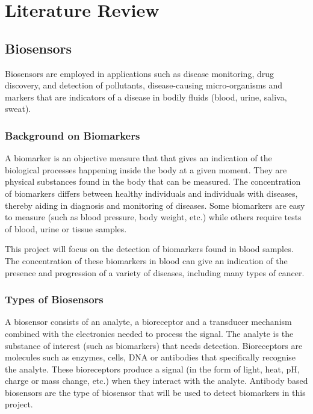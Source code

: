 \graphicspath{{literature_review/fig/}}

\chapter{Literature Review}
\section{Biosensors}
Biosensors are employed in applications such as disease monitoring, drug discovery, and detection of pollutants, disease-causing micro-organisms and markers that are indicators of a disease in bodily fluids (blood, urine, saliva, sweat).\cite{bhallaIntroductionBiosensors2016} 
\subsection{Background on Biomarkers}
A biomarker is an objective measure that that gives an indication of the biological processes happening inside the body at a given moment.\cite{BiomarkersNationalInstitute} They are physical substances found in the body that can be measured. The concentration of biomarkers differs between healthy individuals and individuals with diseases, thereby aiding in diagnosis and monitoring of diseases.\cite{rosenzweigWhatArePancreatic2018} Some biomarkers are easy to measure (such as blood pressure, body weight, etc.) while others require tests of blood, urine or tissue samples.\cite{BiomarkersNationalInstitute} 

This project will focus on the detection of biomarkers found in blood samples. The concentration of these biomarkers in blood can give an indication of the presence and progression of a variety of diseases, including many types of cancer.\cite{ribeiroApplicationsElectrochemicalImpedance2024}

\subsection{Types of Biosensors}
A biosensor consists of an analyte, a bioreceptor and a transducer mechanism combined with the electronics needed to process the signal.\cite{bhallaIntroductionBiosensors2016} The analyte is the substance of interest (such as biomarkers) that needs detection. Bioreceptors are molecules such as enzymes, cells, DNA or antibodies that specifically recognise the analyte. These bioreceptors produce a signal (in the form of light, heat, pH, charge or mass change, etc.) when they interact with the analyte.\cite{bhallaIntroductionBiosensors2016} Antibody based biosensors are the type of biosensor that will be used to detect biomarkers in this project.

